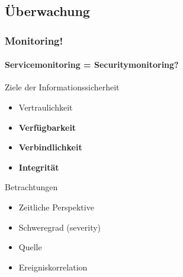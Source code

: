 
\subsection{Überwachung}
\begin{frame}
    \frametitle{Monitoring!}
    \framesubtitle{Servicemonitoring = Securitymonitoring?}
    
    \pause
    
   \begin{exampleblock}{Ziele der Informationssicherheit}
        \begin{itemize}
            \item   Vertraulichkeit
            \item   \textbf{Verfügbarkeit}
            \item   \textbf{Verbindlichkeit}
            \item   \textbf{Integrität}  
        \end{itemize}     
   \end{exampleblock}
    \pause
    \begin{exampleblock}{Betrachtungen}
        \begin{itemize}
            \item Zeitliche Perspektive
            \item Schweregrad (severity)
            \item Quelle
            \item Ereigniskorrelation
        \end{itemize} 
    \end{exampleblock}
            
\end{frame}

